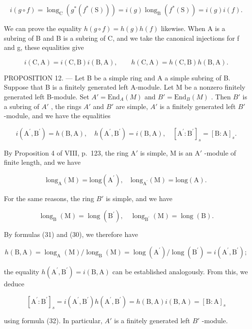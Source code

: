 \[
i (g \circ f) = \operatorname{long} _ {\mathrm{C}} \left(g ^ {*} \left(f ^ {*} (\mathrm{S})\right)\right) = i (g) \operatorname{long} _ {\mathrm{B}} \left(f ^ {*} (\mathrm{S})\right) = i (g) i (f).
\]

We can prove the equality \(h(g \circ f) = h(g)h(f)\) likewise. When A is a subring of B and B is a subring of C, and we take the canonical injections for f and g, these equalities give

\[
i (\mathrm{C}, \mathrm{A}) = i (\mathrm{C}, \mathrm{B}) i (\mathrm{B}, \mathrm{A}), \qquad h (\mathrm{C}, \mathrm{A}) = h (\mathrm{C}, \mathrm{B}) h (\mathrm{B}, \mathrm{A}).\tag{34}
\]

PROPOSITION 12. --- Let B be a simple ring and A a simple subring of B. Suppose that B is a finitely generated left A-module. Let M be a nonzero finitely generated left B-module. Set \(A' = \text{End}_{A}(M)\) and \(B' = \text{End}_{B}(M)\) . Then \(B'\) is a subring of \(A'\) , the rings \(A'\) and \(B'\) are simple, \(A'\) is a finitely generated left \(B'\) -module, and we have the equalities

\[
i (\mathrm{A} ^ {\prime}, \mathrm{B} ^ {\prime}) = h (\mathrm{B}, \mathrm{A}), \quad h (\mathrm{A} ^ {\prime}, \mathrm{B} ^ {\prime}) = i (\mathrm{B}, \mathrm{A}), \quad [ \mathrm{A} ^ {\prime}: \mathrm{B} ^ {\prime} ] _ {s} = [ \mathrm{B}: \mathrm{A} ] _ {s}.
\]

By Proposition 4 of VIII, p.~123, the ring \(\mathrm{A}'\) is simple, \(\mathrm{M}\) is an \(\mathrm{A}'\) -module of finite length, and we have

\[
\mathrm{long} _ {\mathrm{A}} (\mathrm{M}) = \mathrm{long} (\mathrm{A} ^ {\prime}), \quad \mathrm{long} _ {\mathrm{A} ^ {\prime}} (\mathrm{M}) = \mathrm{long} (\mathrm{A}).
\]

For the same reasons, the ring \(B'\) is simple, and we have

\[
\operatorname{long} _ {\mathrm{B}} (\mathrm{M}) = \operatorname{long} \left(\mathrm{B} ^ {\prime}\right), \quad \operatorname{long} _ {\mathrm{B} ^ {\prime}} (\mathrm{M}) = \operatorname{long} (\mathrm{B}).
\]

By formulas (31) and (30), we therefore have

\[
h (\mathrm{B}, \mathrm{A}) = \operatorname{long} _ {\mathrm{A}} (\mathrm{M}) / \operatorname{long} _ {\mathrm{B}} (\mathrm{M}) = \operatorname{long} \left(\mathrm{A} ^ {\prime}\right) / \operatorname{long} \left(\mathrm{B} ^ {\prime}\right) = i \left(\mathrm{A} ^ {\prime}, \mathrm{B} ^ {\prime}\right);
\]

the equality \(h(\mathrm{A}^{\prime},\mathrm{B}^{\prime}) = i(\mathrm{B},\mathrm{A})\) can be established analogously. From this, we deduce

\[
[ \mathrm{A} ^ {\prime}: \mathrm{B} ^ {\prime} ] _ {s} = i (\mathrm{A} ^ {\prime}, \mathrm{B} ^ {\prime}) h (\mathrm{A} ^ {\prime}, \mathrm{B} ^ {\prime}) = h (\mathrm{B}, \mathrm{A}) i (\mathrm{B}, \mathrm{A}) = [ \mathrm{B}: \mathrm{A} ] _ {s}
\]

using formula (32). In particular, \(A'\) is a finitely generated left \(B'\) -module.

